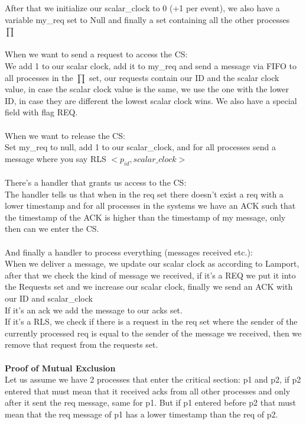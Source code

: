 \documentclass[11pt, a4paper]{article}
\begin{document}
After that we initialize our scalar\_clock to 0 (+1 per event), we also have a variable my\_req set to Null and finally a set containing all the other processes $\prod$\\\\
When we want to send a request to access the CS:\\
We add 1 to our scalar clock, add it to my\_req and send a message via FIFO to all processes in the $\prod$ set, our requests contain our ID and the scalar clock value, in case the scalar clock value is the same, we use the one with the lower ID, in case they are different the lowest scalar clock wins. We also have a special field with flag REQ.\\\\
When we want to release the CS:\\
Set my\_req to null, add 1 to our scalar\_clock, and for all processes send a message where you say RLS $<p_{id},scalar\_clock>$\\\\
There's a handler that grants us access to the CS:\\
The handler tells us that when in the req set there doesn't exist a req with a lower timestamp and for all processes in the systems we have an ACK such that the timestamp of the ACK is higher than the timestamp of my message, only then can we enter the CS.\\\\
And finally a handler to process everything (messages received etc.):\\
When we deliver a message, we update our scalar clock as according to Lamport, after that we check the kind of message we received, if it's a REQ we put it into the Requests set and we increase our scalar clock, finally we send an ACK with our ID and scalar\_clock\\
If it's an ack we add the message to our acks set.\\
If it's a RLS, we check if there is a request in the req set where the sender of the currently processed req is equal to the sender of the message we received, then we remove that request from the requests set.\\\\
\textbf{Proof of Mutual Exclusion}\\
Let us assume we have 2 processes that enter the critical section: p1 and p2, if p2 entered that must mean that it received acks from all other processes and only after it sent the req message, same for p1. But if p1 entered before p2 that must mean that the req message of p1 has a lower timestamp than the req of p2.\\\\
\end{document}
